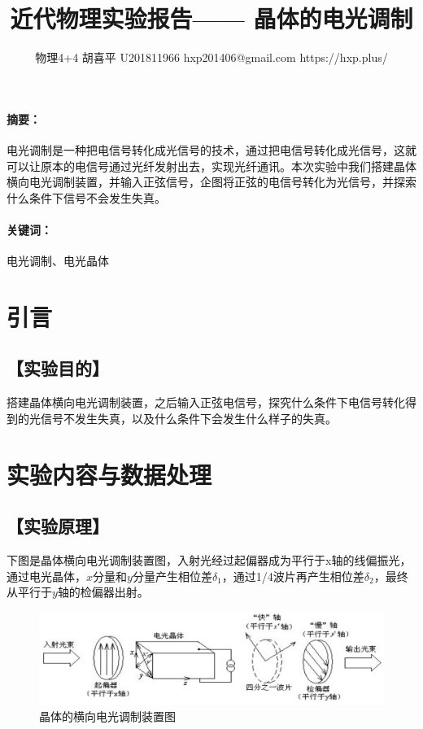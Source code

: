 \documentclass{ctexart}
\date{}
\newcommand{\generatetitle}[6]{\title{\zihao{3}\heiti#1} \author{#2 \quad
    \quad #3 \quad\quad #4 \quad\quad #5 \quad\quad #6} \maketitle\thispagestyle{fancy}}
\let\oldsubsection\subsection
\renewcommand{\subsection}[1]{\oldsubsection{\!\!\!\!\!\!【#1】}}
\let\oldparagraph\paragraph
\renewcommand{\paragraph}[1]{\oldparagraph{#1：\!\!\!\!\!\!}}
\begin{document}
\generatetitle{近代物理实验报告——
  晶体的电光调制}{物理4+4}{胡喜平}{U201811966}{hxp201406@gmail.com}{https://hxp.plus/}

\paragraph{摘要}
电光调制是一种把电信号转化成光信号的技术，通过把电信号转化成光信号，这就可以让原本的电信号通过光纤发射出去，实现光纤通讯。本次实验中我们搭建晶体横向电光调制装置，并输入正弦信号，企图将正弦的电信号转化为光信号，并探索什么条件下信号不会发生失真。

\paragraph{关键词}
电光调制、电光晶体

\section{引言}
\subsection{实验目的}
搭建晶体横向电光调制装置，之后输入正弦电信号，探究什么条件下电信号转化得到的光信号不发生失真，以及什么条件下会发生什么样子的失真。

\section{实验内容与数据处理}
\subsection{实验原理}

下图是晶体横向电光调制装置图，入射光经过起偏器成为平行于x轴的线偏振光，通过电光晶体，$x$分量和$y$分量产生相位差$\delta_1$，通过1/4波片再产生相位差$\delta_2$，最终从平行于$y$轴的检偏器出射。

\begin{figure}[H]
  \centering
  \includegraphics[width=0.9\linewidth]{figures/晶体的横向电光调制}
  \caption{晶体的横向电光调制装置图}
\end{figure}
\end{document}
